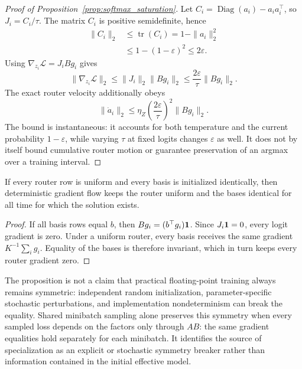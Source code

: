 \begin{proof}[Proof of Proposition~\ref{prop:softmax_saturation}]
Let
$C_i=\operatorname{Diag}(a_i)-a_i a_i^\top$, so $J_i=C_i/\tau$.
The matrix $C_i$ is positive semidefinite, hence
\begin{align}
 \|C_i\|_2
 &\le\operatorname{tr}(C_i)
 =1-\|a_i\|_2^2\\
 &\le1-(1-\varepsilon)^2
 \le2\varepsilon.
\end{align}
Using $\nabla_{z_i}\mathcal L=J_iBg_i$ gives
\begin{equation}
 \|\nabla_{z_i}\mathcal L\|_2
 \le\|J_i\|_2\|Bg_i\|_2
 \le\frac{2\varepsilon}{\tau}\|Bg_i\|_2.
\end{equation}
The exact router velocity additionally obeys
\begin{equation}
 \|\dot a_i\|_2
 \le\eta_Z\left(\frac{2\varepsilon}{\tau}\right)^2\|Bg_i\|_2.
\end{equation}
The bound is instantaneous: it accounts for both temperature and the current
probability $1-\varepsilon$, while varying $\tau$ at fixed logits changes
$\varepsilon$ as well.  It does not by itself bound cumulative router motion
or guarantee preservation of an argmax over a training interval.
\end{proof}

\begin{proposition}
\label{prop:app_symmetry_trap}
If every router row is uniform and every basis is initialized identically,
then deterministic gradient flow keeps the router uniform and the bases
identical for all time for which the solution exists.
\end{proposition}

\begin{proof}
If all basis rows equal $b$, then
$Bg_i=(b^\top g_i)\mathbf{1}$.  Since $J_i\mathbf{1}=0$, every logit gradient is zero.
Under a uniform router, every basis receives the same gradient
$K^{-1}\sum_i g_i$.  Equality of the bases is therefore invariant, which in
turn keeps every router gradient zero.
\end{proof}

The proposition is not a claim that practical floating-point training always
remains symmetric: independent random initialization, parameter-specific
stochastic perturbations, and implementation nondeterminism can break the
equality. Shared minibatch sampling alone preserves this symmetry when every
sampled loss depends on the factors only through $AB$: the same gradient
equalities hold separately for each minibatch. It identifies the
source of specialization as an explicit or stochastic symmetry breaker rather
than information contained in the initial effective model.

